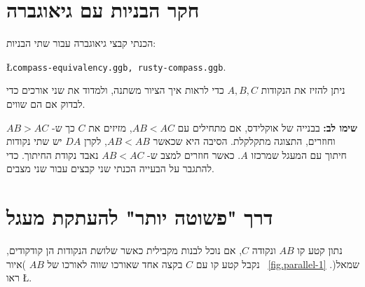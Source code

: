 \documentclass[12pt,a4paper]{article}
\begin{document}

\section{%
חקר הבניות עם גיאוגברה%
}
הכנתי קבצי גיאוגברה עבור שתי הבניות:
\begin{center}
\L{\texttt{compass-equivalency.ggb, rusty-compass.ggb}}.
\end{center}
ניתן להזיז את הנקודות
$A,B,C$
כדי לראות איך הציור משתנה, ולמדוד את שני אורכים כדי לבדוק אם הם שווים.

\textbf{%
שימו לב:%
}
בבנייה של אוקלידס, אם מתחילים עם 
$AB<AC$,
מזיזים את
$C$
כך ש-%
$AB>AC$
וחוזרים, התצוגה מתקלקלת. הסיבה היא שכאשר
$AB<AB$,
לקרן
$DA$
יש שתי נקודות חיתוך עם המעגל שמרכזו
$A$.
כאשר חוזרים למצב ש-%
$AB<AC$
נאבד נקודת החיתוך. כדי להתגבר על הבעייה הכנתי שני קבצים עבור שני מצבים.

\newpage

\section{
דרך "פשוטה יותר" להעתקת מעגל
}

נתון קטע קו 
$AB$
ונקודה
$C$,
אם נוכל לבנות מקבילית כאשר שלושת הנקודות הן קודקודים, נקבל קטע קו עם 
$C$
בקצה אחד שאורכו שווה לאורכו של
$AB$
)איור~%
\ref{fig.parallel-1}
שמאל(.
ראו
\L{\cite[%
207--208
%
]{roads}}.
\end{document}
